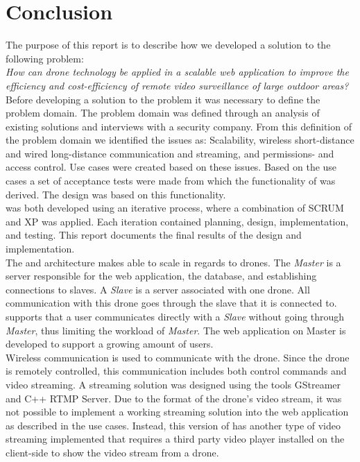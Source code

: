 
\section{Conclusion}
The purpose of this report is to describe how we developed a solution to the following problem: \\

\textit{How can drone technology be applied in a scalable web application to improve the efficiency and cost-efficiency of remote video surveillance of large outdoor areas?} \\

Before developing a solution to the problem it was necessary to define the problem domain.
The problem domain was defined through an analysis of existing solutions and interviews with a security company.
From this definition of the problem domain we identified the issues as: Scalability, wireless short-distance and wired long-distance communication and streaming, and permissions- and access control.
Use cases were created based on these issues.
Based on the use cases a set of acceptance tests were made from which the functionality of \projectname{} was derived. 
The design was based on this functionality. \\

\projectname{} was both developed using an iterative process, where a combination of SCRUM and XP was applied. 
Each iteration contained planning, design, implementation, and testing. 
This report documents the final results of the design and implementation. \\

The  and  architecture makes \projectname{} able to scale in regards to drones. 
The \emph{Master} is a server responsible for the web application, the database, and establishing connections to slaves.
A \emph{Slave} is a server associated with one drone. 
All communication with this drone goes through the slave that it is connected to. \\

\projectname{} supports that a user communicates directly with a \emph{Slave} without going through \emph{Master}, thus limiting the workload of \emph{Master}. 
The web application on Master is developed to support a growing amount of users. \\

Wireless communication is used to communicate with the drone. 
Since the drone is remotely controlled, this communication includes both control commands and video streaming.
A streaming solution was designed using the tools GStreamer and C++ RTMP Server.
Due to the format of the drone's video stream, it was not possible to implement a working streaming solution into the web application as described in the use cases.
Instead, this version of \projectname{} has another type of video streaming implemented that requires a third party video player installed on the client-side to show the video stream from a drone. \\

